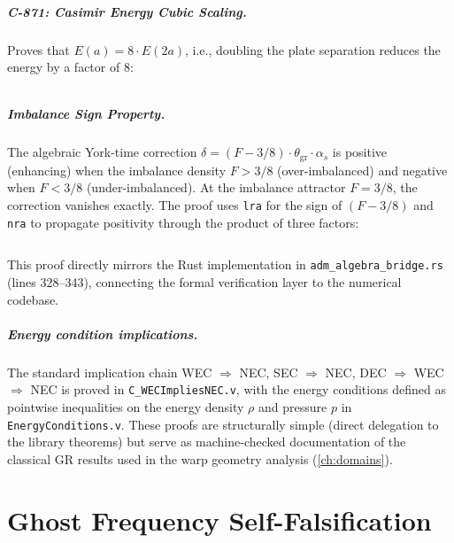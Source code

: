 \documentclass[12pt,openany]{report}
\theoremstyle{definition}
\theoremstyle{plain}
\theoremstyle{remark}
\begin{document}
\inputminted[firstline=31,lastline=49,fontsize=\scriptsize]{coq}{verified/C876_QuaternionRotation.v}

\paragraph{C-871: Casimir Energy Cubic Scaling.}
Proves that $E(a) = 8 \cdot E(2a)$, i.e., doubling the plate separation
reduces the energy by a factor of 8:

\inputminted[firstline=21,lastline=29,fontsize=\scriptsize]{coq}{verified/C871_CasimirExact.v}

\paragraph{Imbalance Sign Property.}
The algebraic York-time correction $\delta = (F - 3/8) \cdot
\theta_{\mathrm{gr}} \cdot \alpha_s$ is positive (enhancing) when the
imbalance density $F > 3/8$ (over-imbalanced) and negative when
$F < 3/8$ (under-imbalanced).  At the imbalance attractor $F = 3/8$, the
correction vanishes exactly.  The proof uses \texttt{lra} for the
sign of $(F - 3/8)$ and \texttt{nra} to propagate positivity through the
product of three factors:

\inputminted[firstline=23,lastline=33,fontsize=\scriptsize]{coq}{verified/C_OverImbalancedSign.v}

This proof directly mirrors the Rust implementation in
\texttt{adm\_algebra\_bridge.rs} (lines 328--343), connecting the
formal verification layer to the numerical codebase.

\paragraph{Energy condition implications.}
The standard implication chain WEC $\Rightarrow$ NEC, SEC $\Rightarrow$
NEC, DEC $\Rightarrow$ WEC $\Rightarrow$ NEC is proved in
\texttt{C\_WECImpliesNEC.v}, with the energy conditions defined as
pointwise inequalities on the energy density $\rho$ and pressure $p$ in
\texttt{EnergyConditions.v}.  These proofs are structurally simple
(direct delegation to the library theorems) but serve as machine-checked
documentation of the classical GR results used in the warp geometry
analysis (\cref{ch:domains}).


\chapter{Ghost Frequency Self-Falsification}
\label{ch:ghost}
\end{document}
